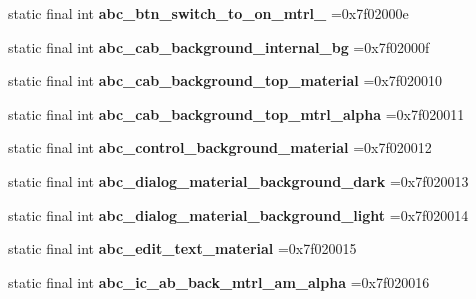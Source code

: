 \begin{DoxyCompactItemize}
static final int {\bfseries abc\+\_\+btn\+\_\+switch\+\_\+to\+\_\+on\+\_\+mtrl\+\_} =0x7f02000e
\item 
\mbox{\label{classproject4_1_1xaria_1_1R_1_1drawable_aca2ed7eb206741c1c02b957c6deadcff}} 
static final int {\bfseries abc\+\_\+cab\+\_\+background\+\_\+internal\+\_\+bg} =0x7f02000f
\item 
\mbox{\label{classproject4_1_1xaria_1_1R_1_1drawable_a1d446056cca78ad91b0b70a5bd4c2892}} 
static final int {\bfseries abc\+\_\+cab\+\_\+background\+\_\+top\+\_\+material} =0x7f020010
\item 
\mbox{\label{classproject4_1_1xaria_1_1R_1_1drawable_ae30891f2b7f510aedbb980deda8eb23f}} 
static final int {\bfseries abc\+\_\+cab\+\_\+background\+\_\+top\+\_\+mtrl\+\_\+alpha} =0x7f020011
\item 
\mbox{\label{classproject4_1_1xaria_1_1R_1_1drawable_ad784fc5e33d9ad5c26f993078c611011}} 
static final int {\bfseries abc\+\_\+control\+\_\+background\+\_\+material} =0x7f020012
\item 
\mbox{\label{classproject4_1_1xaria_1_1R_1_1drawable_a31d603f61b44cfa163cd81230b9d0567}} 
static final int {\bfseries abc\+\_\+dialog\+\_\+material\+\_\+background\+\_\+dark} =0x7f020013
\item 
\mbox{\label{classproject4_1_1xaria_1_1R_1_1drawable_a184030b4cd3d83cd851dff4b9b3d8f2c}} 
static final int {\bfseries abc\+\_\+dialog\+\_\+material\+\_\+background\+\_\+light} =0x7f020014
\item 
\mbox{\label{classproject4_1_1xaria_1_1R_1_1drawable_ace677b9d37715043b5a8b6c071c50fcc}} 
static final int {\bfseries abc\+\_\+edit\+\_\+text\+\_\+material} =0x7f020015
\item 
\mbox{\label{classproject4_1_1xaria_1_1R_1_1drawable_a7ece988643e7f7613420143db7971b07}} 
static final int {\bfseries abc\+\_\+ic\+\_\+ab\+\_\+back\+\_\+mtrl\+\_\+am\+\_\+alpha} =0x7f020016

\end{DoxyCompactItemize}
